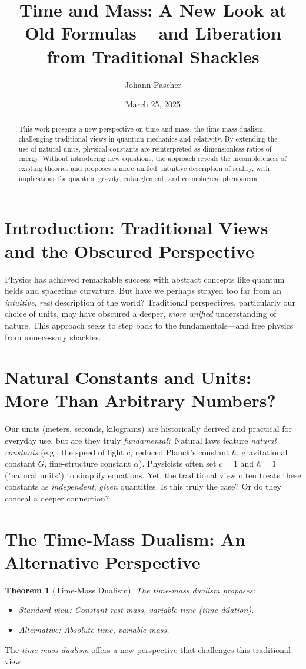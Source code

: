 \documentclass[a4paper,12pt]{article}
\title{Time and Mass: A New Look at Old Formulas – and Liberation from Traditional Shackles}
\author{Johann Pascher}
\date{March 25, 2025}
\newtheorem{theorem}{Theorem}[section]
\begin{document}
	
	\maketitle
	
	\begin{abstract}
		This work presents a new perspective on time and mass, the time-mass dualism, challenging traditional views in quantum mechanics and relativity. By extending the use of natural units, physical constants are reinterpreted as dimensionless ratios of energy. Without introducing new equations, the approach reveals the incompleteness of existing theories and proposes a more unified, intuitive description of reality, with implications for quantum gravity, entanglement, and cosmological phenomena.
	\end{abstract}
	
	\tableofcontents
	\newpage
	
	\section{Introduction: Traditional Views and the Obscured Perspective}
	Physics has achieved remarkable success with abstract concepts like quantum fields and spacetime curvature. But have we perhaps strayed too far from an \emph{intuitive}, \emph{real} description of the world? Traditional perspectives, particularly our choice of units, may have obscured a deeper, \emph{more unified} understanding of nature. This approach seeks to step back to the fundamentals—and free physics from unnecessary shackles.
	
	\section{Natural Constants and Units: More Than Arbitrary Numbers?}
	Our units (meters, seconds, kilograms) are historically derived and practical for everyday use, but are they truly \emph{fundamental}? Natural laws feature \emph{natural constants} (e.g., the speed of light \(c\), reduced Planck’s constant \(\hbar\), gravitational constant \(G\), fine-structure constant \(\alpha\)). Physicists often set \(c = 1\) and \(\hbar = 1\) ("natural units") to simplify equations. Yet, the traditional view often treats these constants as \emph{independent}, \emph{given} quantities. Is this truly the case? Or do they conceal a deeper connection?
	
	\section{The Time-Mass Dualism: An Alternative Perspective}
	\begin{theorem}[Time-Mass Dualism]
		The time-mass dualism proposes:
		\begin{itemize}
			\item Standard view: Constant rest mass, variable time (time dilation).
			\item Alternative: Absolute time, variable mass.
		\end{itemize}
	\end{theorem}
	The \emph{time-mass dualism} offers a new perspective that challenges this traditional view:
	
\end{document}
